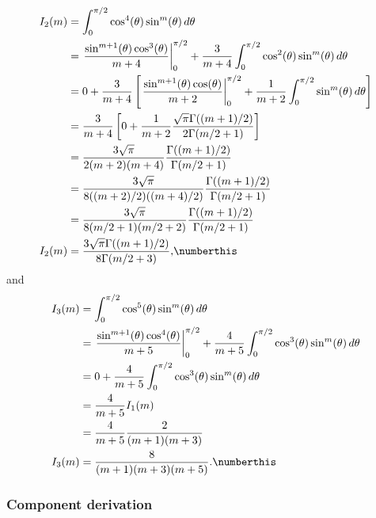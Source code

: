 \begin{align*}
I_2(m) &= \int_0^{\pi/2} \cos^4(\theta) \sin^m(\theta) \, d\theta \\
       &= \left. \frac{\sin^{m+1}(\theta)\cos^3(\theta)}{m+4} \right|_0^{\pi/2}
        + \frac{3}{m+4} \int_0^{\pi/2} \cos^2(\theta)\sin^m(\theta) \, d\theta \\
       &= 0
        + \frac{3}{m+4} \left[
            \left. \frac{\sin^{m+1}(\theta)\cos(\theta)}{m+2} \right|_0^{\pi/2}
          + \frac{1}{m+2} \int_0^{\pi/2} \sin^m(\theta) \, d\theta
          \right] \\
       &= \frac{3}{m+4} \left[
            0 + \frac{1}{m+2} \frac{\sqrt{\pi}\Gamma((m+1)/2)}{2\Gamma(m/2+1)}
          \right] \\
       &= \frac{3\sqrt{\pi}}{2(m+2)(m+4)} \frac{\Gamma((m+1)/2)}{\Gamma(m/2+1)} \\
       &= \frac{3\sqrt{\pi}}{8((m+2)/2)((m+4)/2)} 
          \frac{\Gamma((m+1)/2)}{\Gamma(m/2+1)} \\
       &= \frac{3\sqrt{\pi}}{8(m/2+1)(m/2+2)} 
          \frac{\Gamma((m+1)/2)}{\Gamma(m/2+1)} \\
I_2(m) &= \frac{3\sqrt{\pi} \Gamma((m+1)/2)}{8\Gamma(m/2+3)} 
\text{,}
\numberthis \label{eq:i2} \\
\end{align*}
and
\begin{align*}
I_3(m) &= \int_0^{\pi/2} \cos^5(\theta)\sin^m(\theta)\,d\theta \\
       &= \left. \frac{\sin^{m+1}(\theta)\cos^4(\theta)}{m+5} \right|_0^{\pi/2}
        + \frac{4}{m+5} \int_0^{\pi/2} \cos^3(\theta)\sin^m(\theta)\,d\theta \\
       &= 0
        + \frac{4}{m+5} \int_0^{\pi/2} \cos^3(\theta)\sin^m(\theta)\,d\theta \\
       &= \frac{4}{m+5} I_1(m) \\
       &= \frac{4}{m+5} \frac{2}{(m+1)(m+3)} \\
I_3(m) &= \frac{8}{(m+1)(m+3)(m+5)}  \text{.}
\numberthis \label{eq:i3}
\end{align*}

\subsubsection{Component derivation}
\label{sec:app:4d_derivation}

